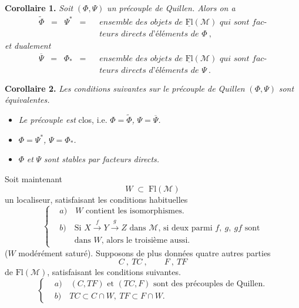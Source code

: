 \documentclass[11pt]{article}
\newcommand{\Fl}{\mathrm{Fl}}
\begin{document}
\textbf{Corollaire 1.} \textit{Soit} $(\Phi,\Psi)$ \textit{un précouple de Quillen. Alors on a}
\[
\begin{aligned}
\widetilde{\Phi} \;\;=\;\; \Psi^* \;\;=\;\; &\textit{ensemble des objets de } \underline{\Fl}(\mathcal{M}) \textit{ qui sont fac-}\\
&\textit{teurs directs d'éléments de } \Phi\ ,
\end{aligned}
\tag*{(4.3)}
\] %
\textit{et dualement}
\[
\begin{aligned}
\overline{\Psi} \;\;=\;\; \Phi_* \;\;=\;\; &\textit{ensemble des objets de } \underline{\Fl}(\mathcal{M}) \textit{ qui sont fac-}\\
&\textit{teurs directs d'éléments de } \Psi\ .
\end{aligned}
\tag*{(4.4)}
\] %

\textbf{Corollaire 2.} \textit{Les conditions suivantes sur le précouple de Quillen} $(\Phi,\Psi)$ \textit{sont équivalentes.}
\begin{itemize}[leftmargin=2.5em]
\item[a)] \textit{Le précouple est} clos, i.e. $\Phi=\widetilde{\Phi}$\textit{,} $\Psi=\overline{\Psi}$\textit{.}
\item[b)] $\Phi=\Psi^*$\textit{,} $\Psi=\Phi_*$\textit{.}
\item[c)] $\Phi$ \textit{et} $\Psi$ \textit{sont stables par facteurs directs.}
\end{itemize}
Soit maintenant
\[
W \;\subset\; \Fl(\mathcal{M})
\tag*{(4.5)}
\]
un localiseur, satisfaisant les conditions habituelles
\[
\left\{
\begin{aligned}
&\textit{a})\quad W \text{ contient les isomorphismes.}\\[1ex]
&\textit{b})\quad \text{Si } X\xrightarrow{\;f\;}Y\xrightarrow{\;g\;}Z \text{ dans } \mathcal{M}\text{, si deux parmi } f,\ g,\ gf \text{ sont}\\
&\phantom{\textit{b})}\quad \text{dans } W\text{, alors le troisième aussi.}
\end{aligned}
\right.
\tag*{(4.6)}
\]
($W$ modérément saturé). Supposons de plus données quatre autres parties
\[
C\ ,\ TC\ , \qquad F\ ,\ TF
\tag*{(4.7)}
\]
de $\Fl(\mathcal{M})$, satisfaisant les conditions suivantes.
\[
\left\{
\begin{aligned}
&\textit{a})\quad (C,TF) \text{ et } (TC,F) \text{ sont des précouples de Quillen.}\\[1ex]
&\textit{b})\quad TC\subset C\cap W,\ TF\subset F\cap W.
\end{aligned}
\right.
\tag*{(4.8)}
\]
\end{document}
